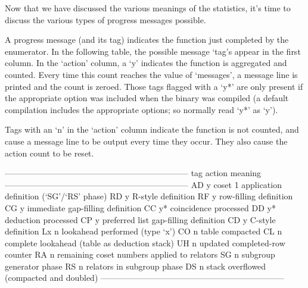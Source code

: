 Now that we have discussed the various  meanings  of  the  statistics,
it's time to discuss the various types of progress messages possible.


A progress message (and its tag) indicates the function just completed
by the enumerator. In the following table, the possible message `tag's
appear in the first column. In the `action' column,  a  `y'  indicates
the function is aggregated and counted. Every time this count  reaches
the value of `messages', a message line is printed and  the  count  is
zeroed. Those tags flagged  with  a  `y*'  are  only  present  if  the
appropriate option was included when the {\ACE} binary was compiled (a
default compilation includes the appropriate options; so normally read
`y*' as `y').

Tags with an `n' in the `action' column indicate the function  is  not
counted, and cause a message line to be output every time they  occur.
They also cause the action count to be reset.

\begintt
------------------------------------------------------------------
tag   action      meaning
------------------------------------------------------------------
AD         y      coset 1 application definition (`SG'/`RS' phase)
RD         y      R-style definition
RF         y      row-filling definition
CG         y      immediate gap-filling definition
CC         y*     coincidence processed
DD         y*     deduction processed
CP         y      preferred list gap-filling definition
CD         y      C-style definition
Lx         n      lookahead performed (type `x')
CO         n      table compacted
CL         n      complete lookahead (table as deduction stack)
UH         n      updated completed-row counter
RA         n      remaining coset numbers applied to relators
SG         n      subgroup generator phase
RS         n      relators in subgroup phase
DS         n      stack overflowed (compacted and doubled)
------------------------------------------------------------------
\endtt

